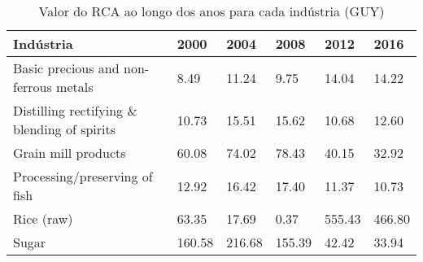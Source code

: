 \begin{table}
\centering
\caption{Valor do RCA ao longo dos anos para cada indústria (GUY)}
\label{tab:ex3-tempo-GUY}
\begin{tabular}{p{6cm}p{1.5cm}p{1.5cm}p{1.5cm}p{1.5cm}p{1.5cm}}
\toprule
                                  Indústria &   2000 &   2004 &   2008 &   2012 &   2016 \\
\midrule
      Basic precious and non-ferrous metals &   8.49 &  11.24 &   9.75 &  14.04 &  14.22 \\
Distilling rectifying \& blending of spirits &  10.73 &  15.51 &  15.62 &  10.68 &  12.60 \\
                        Grain mill products &  60.08 &  74.02 &  78.43 &  40.15 &  32.92 \\
              Processing/preserving of fish &  12.92 &  16.42 &  17.40 &  11.37 &  10.73 \\
                                 Rice (raw) &  63.35 &  17.69 &   0.37 & 555.43 & 466.80 \\
                                      Sugar & 160.58 & 216.68 & 155.39 &  42.42 &  33.94 \\
\bottomrule
\end{tabular}
\end{table}
